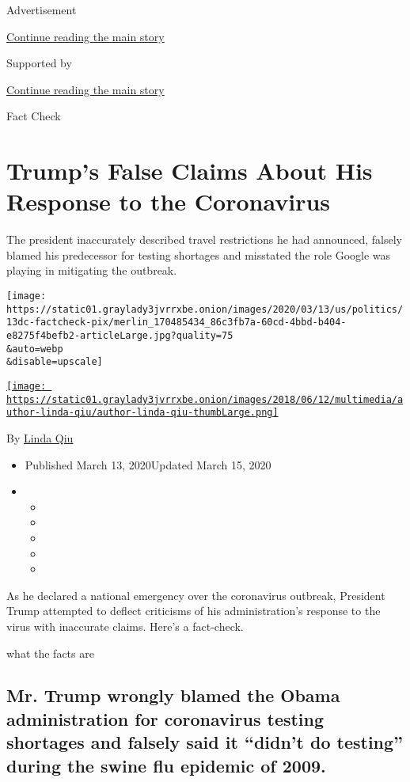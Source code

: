 Advertisement

\protect\hyperlink{after-top}{Continue reading the main story}

Supported by

\protect\hyperlink{after-sponsor}{Continue reading the main story}

Fact Check

\hypertarget{trumps-false-claims-about-his-response-to-the-coronavirus}{%
\section{Trump's False Claims About His Response to the
Coronavirus}\label{trumps-false-claims-about-his-response-to-the-coronavirus}}

The president inaccurately described travel restrictions he had
announced, falsely blamed his predecessor for testing shortages and
misstated the role Google was playing in mitigating the outbreak.

\texttt{[image: https://static01.graylady3jvrrxbe.onion/images/2020/03/13/us/politics/13dc-factcheck-pix/merlin\_170485434\_86c3fb7a-60cd-4bbd-b404-e8275f4befb2-articleLarge.jpg?quality=75\\\&auto=webp\\\&disable=upscale]}

\href{https://www.nytimes3xbfgragh.onion/by/linda-qiu}{\texttt{[image: https://static01.graylady3jvrrxbe.onion/images/2018/06/12/multimedia/author-linda-qiu/author-linda-qiu-thumbLarge.png]}}

By \href{https://www.nytimes3xbfgragh.onion/by/linda-qiu}{Linda Qiu}

\begin{itemize}
\item
  Published March 13, 2020Updated March 15, 2020
\item
  \begin{itemize}
  \item
  \item
  \item
  \item
  \item
  \end{itemize}
\end{itemize}

As he declared a national emergency over the coronavirus outbreak,
President Trump attempted to deflect criticisms of his administration's
response to the virus with inaccurate claims. Here's a fact-check.

what the facts are

\hypertarget{mr-trump-wrongly-blamed-the-obama-administration-for-coronavirus-testing-shortages-and-falsely-said-it-didnt-do-testing-during-the-swine-flu-epidemic-of-2009}{%
\subsection{Mr. Trump wrongly blamed the Obama administration for
coronavirus testing shortages and falsely said it ``didn't do testing''
during the swine flu epidemic of
2009.}\label{mr-trump-wrongly-blamed-the-obama-administration-for-coronavirus-testing-shortages-and-falsely-said-it-didnt-do-testing-during-the-swine-flu-epidemic-of-2009}}

